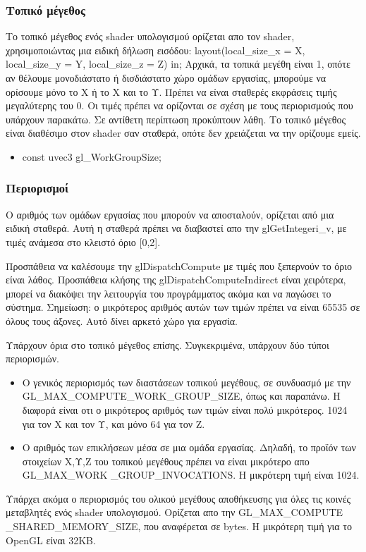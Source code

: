 \subsubsection{Τοπικό μέγεθος}
Το τοπικό μέγεθος ενός shader υπολογισμού ορίζεται απο τον shader, χρησιμοποιώντας μια ειδική δήλωση εισόδου: 
layout(local\_size\_x = X, local\_size\_y = Y, local\_size\_z = Z) in;
Αρχικά, τα τοπικά μεγέθη είναι 1, οπότε αν θέλουμε μονοδιάστατο ή δισδιάστατο χώρο ομάδων εργασίας, μπορούμε να ορίσουμε μόνο το Χ ή το Χ και το Υ. Πρέπει να είναι σταθερές εκφράσεις τιμής μεγαλύτερης του 0. Οι τιμές πρέπει να ορίζονται σε σχέση με τους περιορισμούς που υπάρχουν παρακάτω. Σε αντίθετη περίπτωση προκύπτουν λάθη. Το τοπικό μέγεθος είναι διαθέσιμο στον shader σαν σταθερά, οπότε δεν χρειάζεται να την ορίζουμε εμείς.
\begin{itemize}
\item const uvec3 gl\_WorkGroupSize;
\end{itemize}
\subsubsection{Περιορισμοί}
Ο αριθμός των ομάδων εργασίας που μπορούν να αποσταλούν, ορίζεται από μια ειδική σταθερά. Αυτή η σταθερά πρέπει να διαβαστεί απο την glGetIntegeri\_v, με τιμές ανάμεσα στο κλειστό όριο [0,2]. 

Προσπάθεια να καλέσουμε την glDispatchCompute με τιμές που ξεπερνούν το όριο είναι λάθος. Προσπάθεια κλήσης της glDispatchComputeIndirect είναι χειρότερα, μπορεί να διακόψει την λειτουργία του προγράμματος ακόμα και να παγώσει το σύστημα. Σημείωση: ο μικρότερος αριθμός αυτών των τιμών πρέπει να είναι 65535 σε όλους τους άξονες. Αυτό δίνει αρκετό χώρο για εργασία. 

Υπάρχουν όρια στο τοπικό μέγεθος επίσης. Συγκεκριμένα, υπάρχουν δύο τύποι περιορισμών. 
\begin{itemize}
\item Ο γενικός περιορισμός των διαστάσεων τοπικού μεγέθους, σε συνδυασμό με την GL\_MAX\_COMPUTE\_WORK\_GROUP\_SIZE, όπως και παραπάνω. Η διαφορά είναι οτι ο μικρότερος αριθμός των τιμών είναι πολύ μικρότερος. 1024 για τον Χ και τον Υ, και μόνο 64 για τον Ζ.
\item Ο αριθμός των επικλήσεων μέσα σε μια ομάδα εργασίας. Δηλαδή, το προϊόν των στοιχείων Χ,Υ,Ζ του τοπικού μεγέθους πρέπει να είναι μικρότερο απο GL\_MAX\_WORK \_GROUP\_INVOCATIONS. Η μικρότερη τιμή είναι 1024.
\end{itemize}
Υπάρχει ακόμα ο περιορισμός του ολικού μεγέθους αποθήκευσης για όλες τις κοινές μεταβλητές ενός shader υπολογισμού. Ορίζεται απο την GL\_MAX\_COMPUTE \_SHARED\_MEMORY\_SIZE, που αναφέρεται σε bytes. Η μικρότερη τιμή για το OpenGL είναι 32KB.
